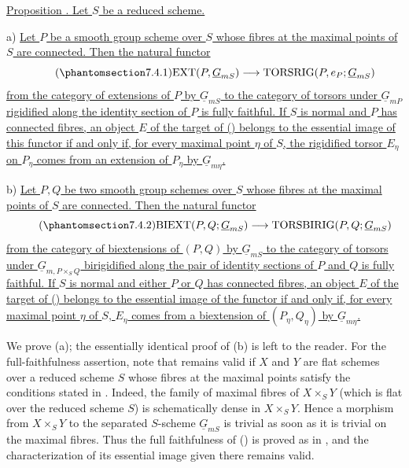 
\medskip
\noindent\underline{Proposition .  Let $S$ be a reduced scheme.}

\smallskip
\noindent a) \underline{Let $P$ be a smooth group scheme over $S$ whose
fibres at the maximal points of $S$ are connected.  Then the natural
functor}
\begin{equation}\tag{\SGARefTarget{sga7.sga7i.eviii.n7-4-1}{7.4.1}}
 \mathrm{EXT}(P,\underline G_{mS})
 \longrightarrow
 \mathrm{TORSRIG}(P,e_P;\underline G_{mS})
\end{equation}
\underline{from the category of extensions of $P$ by $\underline G_{mS}$
to the category of torsors under $\underline G_{mP}$ rigidified along the
identity section of $P$ is fully faithful.  If $S$ is normal and $P$ has
connected fibres, an object $E$ of the target of () belongs to the
essential image of this functor if and only if, for every maximal point
$\eta$ of $S$, the rigidified torsor $E_\eta$ on $P_\eta$ comes from an
extension of $P_\eta$ by $\underline G_{m\eta}$.}

\smallskip
\noindent b) \underline{Let $P,Q$ be two smooth group schemes over $S$
whose fibres at the maximal points of $S$ are connected.  Then the natural
functor}
\begin{equation}\tag{\SGARefTarget{sga7.sga7i.eviii.n7-4-2}{7.4.2}}
 \mathrm{BIEXT}(P,Q;\underline G_{mS})
 \longrightarrow
 \mathrm{TORSBIRIG}(P,Q;\underline G_{mS})
\end{equation}
\underline{from the category of biextensions of $(P,Q)$ by
$\underline G_{mS}$ to the category of torsors under
$\underline G_{m,P\times_S Q}$ birigidified along the pair of identity
sections of $P$ and $Q$ is fully faithful.  If $S$ is normal and either $P$
or $Q$ has connected fibres, an object $E$ of the target of () belongs
to the essential image of the functor if and only if, for every maximal
point $\eta$ of $S$, $E_\eta$ comes from a biextension of
$(P_\eta,Q_\eta)$ by $\underline G_{m\eta}$.}

We prove (a); the essentially identical proof of (b) is left to the reader.
For the full-faithfulness assertion, note that  remains valid if $X$ and
$Y$ are flat schemes over a reduced scheme $S$ whose fibres at the maximal
points satisfy the conditions stated in .  Indeed, the family of maximal
fibres of $X\times_S Y$ (which is flat over the reduced scheme $S$) is
schematically dense in $X\times_S Y$.  Hence a morphism from
$X\times_S Y$ to the separated $S$-scheme $\underline G_{mS}$ is trivial
as soon as it is trivial on the maximal fibres.  Thus the full faithfulness
of () is proved as in , and the characterization of its essential
image given there remains valid.

